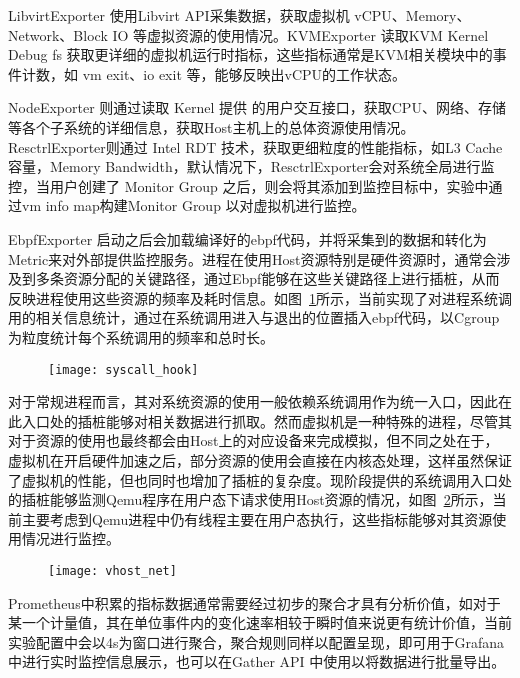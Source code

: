 LibvirtExporter 使用Libvirt API采集数据，获取虚拟机 vCPU、Memory、Network、Block IO 等虚拟资源的使用情况。KVMExporter 读取KVM Kernel Debug fs 获取更详细的虚拟机运行时指标，这些指标通常是KVM相关模块中的事件计数，如 vm exit、io exit 等，能够反映出vCPU的工作状态。

NodeExporter 则通过读取 Kernel 提供 的用户交互接口，获取CPU、网络、存储等各个子系统的详细信息，获取Host主机上的总体资源使用情况。ResctrlExporter则通过 Intel RDT 技术，获取更细粒度的性能指标，如L3 Cache容量，Memory Bandwidth，默认情况下，ResctrlExporter会对系统全局进行监控，当用户创建了 Monitor Group 之后，则会将其添加到监控目标中，实验中通过vm info map构建Monitor Group 以对虚拟机进行监控。

EbpfExporter 启动之后会加载编译好的ebpf代码，并将采集到的数据和转化为Metric来对外部提供监控服务。进程在使用Host资源特别是硬件资源时，通常会涉及到多条资源分配的关键路径，通过Ebpf能够在这些关键路径上进行插桩，从而反映进程使用这些资源的频率及耗时信息。如图~\ref{fig:syscall_hook}所示，当前实现了对进程系统调用的相关信息统计，通过在系统调用进入与退出的位置插入ebpf代码，以Cgroup为粒度统计每个系统调用的频率和总时长。

\begin{figure}[!htbp]
    \centering
    \texttt{[image: syscall\_hook]}
    \label{fig:syscall_hook}
\end{figure}

对于常规进程而言，其对系统资源的使用一般依赖系统调用作为统一入口，因此在此入口处的插桩能够对相关数据进行抓取。然而虚拟机是一种特殊的进程，尽管其对于资源的使用也最终都会由Host上的对应设备来完成模拟，但不同之处在于，虚拟机在开启硬件加速之后，部分资源的使用会直接在内核态处理，这样虽然保证了虚拟机的性能，但也同时也增加了插桩的复杂度。现阶段提供的系统调用入口处的插桩能够监测Qemu程序在用户态下请求使用Host资源的情况，如图~\ref{fig:vhost_net}所示，当前主要考虑到Qemu进程中仍有线程主要在用户态执行，这些指标能够对其资源使用情况进行监控。

\begin{figure}[!htbp]
    \centering
    \texttt{[image: vhost\_net]}
    \label{fig:vhost_net}
\end{figure}

Prometheus中积累的指标数据通常需要经过初步的聚合才具有分析价值，如对于某一个计量值，其在单位事件内的变化速率相较于瞬时值来说更有统计价值，当前实验配置中会以4s为窗口进行聚合，聚合规则同样以配置呈现，即可用于Grafana中进行实时监控信息展示，也可以在Gather API 中使用以将数据进行批量导出。

